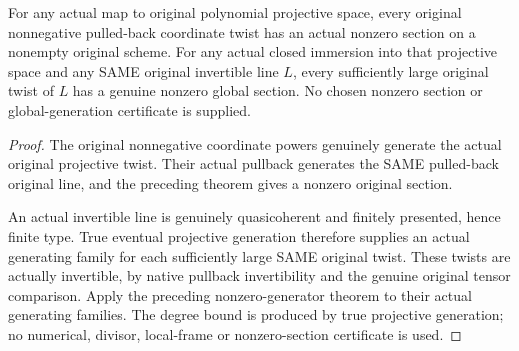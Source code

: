 \begin{theorem}
\label{thm:fc-original-line-eventual-nonzero-sections}
\leanok
{}
For any actual map to original polynomial projective space, every original
nonnegative pulled-back coordinate twist has an actual nonzero section
on a nonempty original scheme. For any actual closed immersion into
that projective space and any SAME original invertible line $L$, every
sufficiently large original twist of $L$ has a genuine nonzero global
section. No chosen nonzero section or global-generation certificate is
supplied.
\end{theorem}
\begin{proof}
The original nonnegative coordinate powers genuinely generate the actual
original projective twist. Their actual pullback generates the SAME
pulled-back original line, and the preceding theorem gives a nonzero
original section.

An actual invertible line is genuinely quasicoherent and finitely
presented, hence finite type. True eventual projective generation
therefore supplies an actual generating family for each sufficiently
large SAME original twist. These twists are actually invertible, by
native pullback invertibility and the genuine original tensor comparison.
Apply the preceding nonzero-generator theorem to their actual generating
families. The degree bound is produced by true projective generation;
no numerical, divisor, local-frame or nonzero-section certificate is used.
\end{proof}
